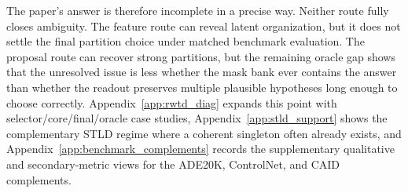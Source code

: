 The paper's answer is therefore incomplete in a precise way. Neither route fully closes ambiguity. The feature route can reveal latent organization, but it does not settle the final partition choice under matched benchmark evaluation. The proposal route can recover strong partitions, but the remaining oracle gap shows that the unresolved issue is less whether the mask bank ever contains the answer than whether the readout preserves multiple plausible hypotheses long enough to choose correctly. Appendix~\ref{app:rwtd_diag} expands this point with selector/core/final/oracle case studies, Appendix~\ref{app:stld_support} shows the complementary STLD regime where a coherent singleton often already exists, and Appendix~\ref{app:benchmark_complements} records the supplementary qualitative and secondary-metric views for the ADE20K, ControlNet, and CAID complements.
